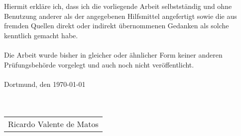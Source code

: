 Hiermit erkläre ich, dass ich die vorliegende Arbeit selbstständig
und ohne Benutzung anderer als der angegebenen Hilfsmittel angefertigt
sowie die aus fremden Quellen direkt oder indirekt übernommenen
Gedanken als solche kenntlich gemacht habe. \\ \\
Die Arbeit wurde bisher in gleicher oder ähnlicher Form keiner
anderen Prüfungsbehörde vorgelegt und auch noch nicht veröffentlicht. \\ \\
Dortmund, den \today \\ \\ \\
\begin{tabular}{@{}l@{}}\hline
	Ricardo Valente de Matos
\end{tabular}